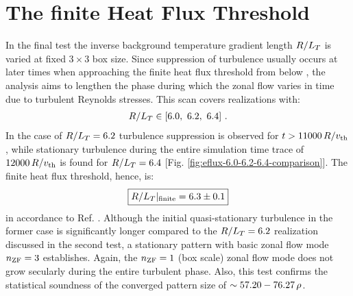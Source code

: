 
\newpage
\section{The finite Heat Flux Threshold}
\label{sec:threshold}

In the final test the inverse background temperature gradient length $R/L_T$ is varied at fixed $3\times3$ box size.
Since suppression of turbulence usually occurs at later times when approaching the finite heat flux threshold from below \cite{Peeters2016}, the analysis aims to lengthen the phase during which the zonal flow varies in time due to turbulent Reynolds stresses.
This scan covers realizations with:
\begin{gather*}
	R/L_T \in [6.0,~6.2,~6.4]~.
\end{gather*}
In the case of $R/L_T = 6.2$ turbulence suppression is observed for $t > 11000\,R/v_{\mathrm{th}}$, while stationary turbulence during the entire simulation time trace of $12000\,R/v_{\mathrm{th}}$ is found for $R/L_T = 6.4$ [Fig. \ref{fig:eflux-6.0-6.2-6.4-comparison}].
The finite heat flux threshold, hence, is:
\begin{gather*}
	\boxed{R/L_T|_\mathrm{finite} = 6.3 \pm 0.1}
\end{gather*}
in accordance to Ref. .
Although the initial quasi-stationary turbulence in the former case is significantly longer compared to the $R/L_T = 6.2$ realization discussed in the second test, a stationary pattern with basic zonal flow mode $n_\mathrm{ZF} = 3$ establishes. 
Again, the $n_\mathrm{ZF} = 1$ (box scale) zonal flow mode does not grow secularly during the entire turbulent phase.
Also, this test confirms the statistical soundness of the converged pattern size of $\sim 57.20 - 76.27\,\rho$.

